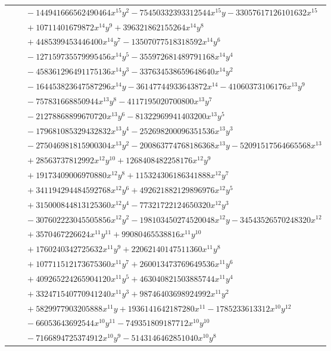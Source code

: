 \documentclass[11pt]{article}
\begin{document}
\begin{longtable}{@{}ll@{}}
 & $\quad -144941666562490464x^{15}y^{2}-75450332393312544x^{15}y-33057617126101632x^{15}$\\
 & $\quad +10711401679872x^{14}y^{9}+396321862155264x^{14}y^{8}$\\
 & $\quad +4485399453446400x^{14}y^{7}-13507077518318592x^{14}y^{6}$\\
 & $\quad -127159735579995456x^{14}y^{5}-355972681489791168x^{14}y^{4}$\\
 & $\quad -458361296491175136x^{14}y^{3}-337634538659648640x^{14}y^{2}$\\
 & $\quad -164453823647587296x^{14}y-36147744933643872x^{14}-41060373106176x^{13}y^{9}$\\
 & $\quad -757831668850944x^{13}y^{8}-4117195020700800x^{13}y^{7}$\\
 & $\quad -21278868899670720x^{13}y^{6}-81322969941403200x^{13}y^{5}$\\
 & $\quad -179681085329432832x^{13}y^{4}-252698200096351536x^{13}y^{3}$\\
 & $\quad -275046981815900304x^{13}y^{2}-200863774768186368x^{13}y-52091517564665568x^{13}$\\
 & $\quad +28563737812992x^{12}y^{10}+1268408482258176x^{12}y^{9}$\\
 & $\quad +19173409006970880x^{12}y^{8}+115324306186341888x^{12}y^{7}$\\
 & $\quad +341194294484592768x^{12}y^{6}+492621882129896976x^{12}y^{5}$\\
 & $\quad +315000844813125360x^{12}y^{4}-77321722124650320x^{12}y^{3}$\\
 & $\quad -307602223045505856x^{12}y^{2}-198103450274520048x^{12}y-34543526570248320x^{12}$\\
 & $\quad +3570467226624x^{11}y^{11}+99080465538816x^{11}y^{10}$\\
 & $\quad +1760240342725632x^{11}y^{9}+22062140147511360x^{11}y^{8}$\\
 & $\quad +107711512173675360x^{11}y^{7}+260013473769649536x^{11}y^{6}$\\
 & $\quad +409265224265904120x^{11}y^{5}+463040821503885744x^{11}y^{4}$\\
 & $\quad +332471540770941240x^{11}y^{3}+98746403698924992x^{11}y^{2}$\\
 & $\quad +5829977903205888x^{11}y+1936141642187280x^{11}-1785233613312x^{10}y^{12}$\\
 & $\quad -66053643692544x^{10}y^{11}-749351809187712x^{10}y^{10}$\\
 & $\quad -7166894725374912x^{10}y^{9}-5143146462851040x^{10}y^{8}$\\

\end{longtable}
\end{document}
